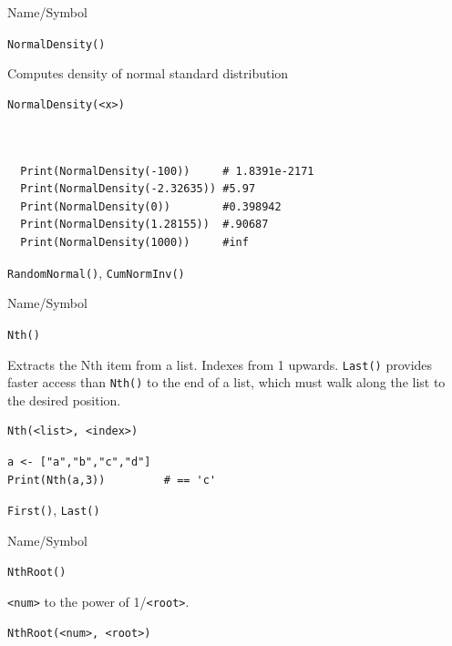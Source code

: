 \begin{desc}{Name/Symbol}
\item[Name/Symbol]	\verb+NormalDensity()+

\item[Description]	Computes density of normal standard distribution
\item[Usage]
\begin{verbatim}
NormalDensity(<x>)
\end{verbatim}

\item[Example]	
\begin{verbatim}


  Print(NormalDensity(-100))     # 1.8391e-2171
  Print(NormalDensity(-2.32635)) #5.97
  Print(NormalDensity(0))        #0.398942
  Print(NormalDensity(1.28155))  #.90687
  Print(NormalDensity(1000))     #inf

\end{verbatim}

\item[See Also]	\verb+RandomNormal()+, \verb+CumNormInv()+ 
\end{desc}



\begin{desc}{Name/Symbol}
\item[Name/Symbol]	\verb+Nth()+

\item[Description]	Extracts the Nth item from a list.  Indexes from 1 upwards.
		\verb+Last()+ provides faster access than \verb+Nth()+ to the end of a list, 
		which must walk along the list to the desired position.

\item[Usage]
\begin{verbatim}
Nth(<list>, <index>)
\end{verbatim}

\item[Example]	
\begin{verbatim}
a <- ["a","b","c","d"]
Print(Nth(a,3)) 		# == 'c'
\end{verbatim}

\item[See Also]	\verb+First()+, \verb+Last()+ 
\end{desc}

\begin{desc}{Name/Symbol}
\item[Name/Symbol]	\verb+NthRoot()+

\item[Description]	\verb+<num>+ to the power of  1/\verb+<root>+.

\item[Usage]		
\begin{verbatim}
NthRoot(<num>, <root>)
\end{verbatim}

\item[Example]	

\item[See Also]	
\end{desc}

